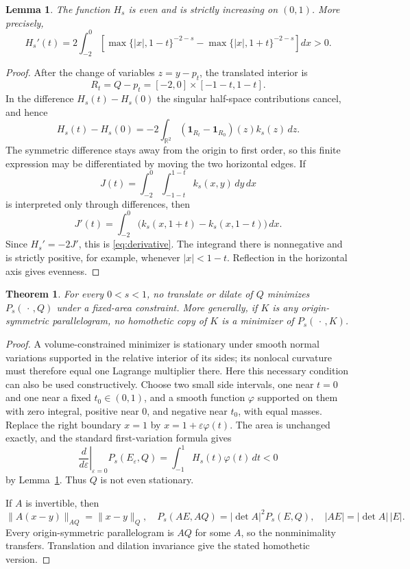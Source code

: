 \documentclass[11pt]{article}
\newtheorem{theorem}{Theorem}
\newtheorem{lemma}{Lemma}
\newcommand{\R}{\mathbb R}
\newcommand{\cQ}{Q}
\newcommand{\Ps}{P_s}
\begin{document}
\begin{lemma}\label{lem:curvature}
The function $H_s$ is even and is strictly increasing on $(0,1)$.  More
precisely,
\begin{equation}\label{eq:derivative}
 H_s'(t)=2\int_{-2}^{0}
 \left[
  \max\{|x|,1-t\}^{-2-s}
  -\max\{|x|,1+t\}^{-2-s}
 \right]dx>0.
\end{equation}
\end{lemma}

\begin{proof}
After the change of variables $z=y-p_t$, the translated interior is
\[
 R_t=\cQ-p_t=[-2,0]\times[-1-t,1-t].
\]
In the difference $H_s(t)-H_s(0)$ the singular half-space contributions
cancel, and hence
\[
 H_s(t)-H_s(0)
 =-2\int_{\R^2}
   (\mathbf1_{R_t}-\mathbf1_{R_0})(z)k_s(z)\,dz.
\]
The symmetric difference stays away from the origin to first order, so this
finite expression may be differentiated by moving the two horizontal edges.
If
\[
 J(t)=\int_{-2}^{0}\int_{-1-t}^{1-t}k_s(x,y)\,dy\,dx
\]
is interpreted only through differences, then
\[
 J'(t)=\int_{-2}^{0}
 \bigl(k_s(x,1+t)-k_s(x,1-t)\bigr)\,dx.
\]
Since $H_s'=-2J'$, this is \eqref{eq:derivative}.  The integrand there is
nonnegative and is strictly positive, for example, whenever $|x|<1-t$.
Reflection in the horizontal axis gives evenness.
\end{proof}

\begin{theorem}\label{thm:notminimal}
For every $0<s<1$, no translate or dilate of $\cQ$ minimizes
$\Ps(\,\cdot\,,\cQ)$ under a fixed-area constraint.  More generally, if $K$
is any origin-symmetric parallelogram, no homothetic copy of $K$ is a
minimizer of $\Ps(\,\cdot\,,K)$.
\end{theorem}

\begin{proof}
A volume-constrained minimizer is stationary under smooth normal variations
supported in the relative interior of its sides; its nonlocal curvature must
therefore equal one Lagrange multiplier there.  Here this necessary condition
can also be used constructively.  Choose two small side intervals, one near
$t=0$ and one near a fixed $t_0\in(0,1)$, and a smooth function $\varphi$
supported on them with zero integral, positive near $0$, and negative near
$t_0$, with equal masses.  Replace the right boundary $x=1$ by
$x=1+\varepsilon\varphi(t)$.  The area is unchanged exactly, and the standard
first-variation formula gives
\[
 \left.\frac d{d\varepsilon}\right|_{\varepsilon=0}
 \Ps(E_\varepsilon,\cQ)
 =\int_{-1}^{1}H_s(t)\varphi(t)\,dt<0
\]
by Lemma~\ref{lem:curvature}.  Thus $\cQ$ is not even stationary.

If $A$ is invertible, then
\[
 \lVert A(x-y)\rVert_{A\cQ}=\lVert x-y\rVert_{\cQ},
 \quad
 \Ps(AE,A\cQ)=|\det A|^2\Ps(E,\cQ),
 \quad |AE|=|\det A|\,|E|.
\]
Every origin-symmetric parallelogram is $A\cQ$ for some $A$, so the
nonminimality transfers.  Translation and dilation invariance give the stated
homothetic version.
\end{proof}
\end{document}
